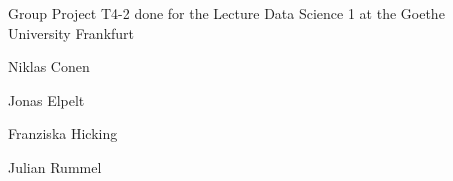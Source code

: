 \label{index_md__home_nordegraf_Uni_8__Semester_Data_Science_I_datascience1_group42_README}%
%
Group Project T4-\/2 done for the Lecture Data Science 1 at the Goethe University Frankfurt
\begin{DoxyItemize}
\item Niklas Conen
\item Jonas Elpelt
\item Franziska Hicking
\item Julian Rummel 
\end{DoxyItemize}